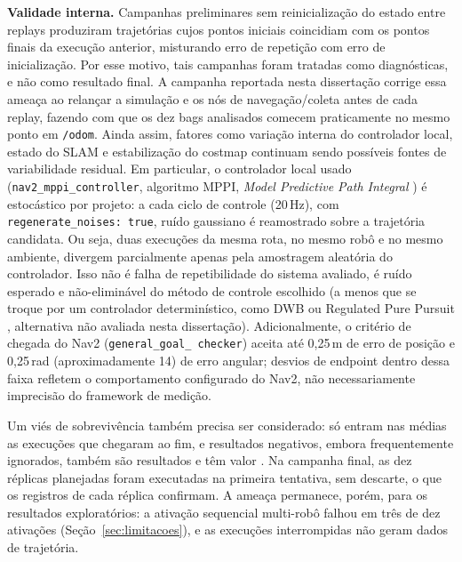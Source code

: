 \textbf{Validade interna.} Campanhas preliminares sem reinicialização do estado
entre replays produziram trajetórias cujos pontos iniciais coincidiam com os
pontos finais da execução anterior, misturando erro de repetição com erro de
inicialização. Por esse motivo, tais campanhas foram tratadas como diagnósticas,
e não como resultado final. A campanha reportada nesta dissertação corrige essa
ameaça ao relançar a simulação e os nós de navegação/coleta antes de cada replay,
fazendo com que os dez bags analisados comecem praticamente no mesmo ponto em
\texttt{/\allowbreak odom}. Ainda assim, fatores como variação interna do controlador
local, estado do SLAM e estabilização do costmap continuam sendo possíveis fontes
de variabilidade residual. Em particular, o controlador local usado
(\texttt{nav2\_\allowbreak mppi\_\allowbreak controller}, algoritmo MPPI, \textit{Model
Predictive Path Integral} \cite{williams2016}) é estocástico por projeto: a
cada ciclo de controle
(20\,Hz), com \texttt{regenerate\_\allowbreak noises: true}, ruído gaussiano é
reamostrado sobre a trajetória candidata. Ou seja, duas execuções da mesma
rota, no mesmo robô e no mesmo ambiente, divergem parcialmente apenas pela
amostragem aleatória do controlador. Isso não é falha de repetibilidade do
sistema avaliado, é ruído esperado e não-eliminável do método de controle
escolhido (a menos que se troque por um controlador determinístico, como DWB
\cite{fox1997} ou Regulated Pure Pursuit \cite{macenski2023survey}, alternativa
não avaliada nesta dissertação).
Adicionalmente, o critério de chegada do Nav2 (\texttt{general\_\allowbreak goal\_\allowbreak
checker}) aceita até 0,25\,m de erro de posição e 0,25\,rad (aproximadamente
14\textdegree{}) de erro angular; desvios de endpoint dentro dessa faixa refletem o
comportamento configurado do Nav2, não necessariamente imprecisão do
framework de medição.

Um viés de sobrevivência também precisa ser considerado: só entram nas
médias as execuções que chegaram ao fim, e resultados negativos, embora
frequentemente ignorados, também são resultados e têm valor \cite{borji2018}. Na campanha final, as dez
réplicas planejadas foram executadas na primeira tentativa, sem descarte, o
que os registros de cada réplica confirmam. A ameaça permanece, porém, para
os resultados exploratórios: a ativação sequencial multi-robô falhou em três
de dez ativações (Seção~\ref{sec:limitacoes}), e as execuções interrompidas
não geram dados de trajetória.

